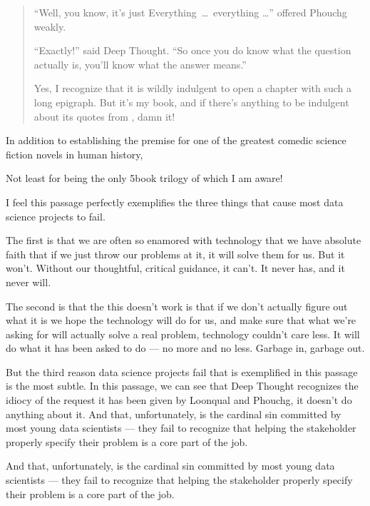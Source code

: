 \documentclass[letterpaper,10pt,english]{jupyterBook}
\begin{document}
\begin{quote}
\sphinxAtStartPar
“Well, you know, it’s just Everything … everything …” offered Phouchg weakly.

\sphinxAtStartPar
“Exactly!” said Deep Thought. “So once you do know what the question actually is, you’ll know what the answer means.”%
\begin{footnote}[1]\sphinxAtStartFootnote
Yes, I recognize that it is wildly indulgent to open a chapter with such a long epigraph. But it’s my book, and if there’s anything to be indulgent about its quotes from , damn it!
%
\end{footnote}
\end{quote}

\sphinxAtStartPar
In addition to establishing the premise for one of the greatest comedic science fiction novels in human history,%
\begin{footnote}[2]\sphinxAtStartFootnote
Not least for being the only 5\sphinxhyphen{}book trilogy of which I am aware!
%
\end{footnote} I feel this passage perfectly exemplifies the three things that cause most data science projects to fail.

\sphinxAtStartPar
The first is that we are often so enamored with technology that we have absolute faith that if we just throw our problems at it, it will solve them for us. But it won’t. Without our thoughtful, critical guidance, it can’t. It never has, and it never will.

\sphinxAtStartPar
The second is that the  this doesn’t work is that if we don’t actually figure out what it is we hope the technology will do for us, and make sure that what we’re asking for will actually solve a real problem, technology couldn’t care less. It will do what it has been asked to do — no more and no less. Garbage in, garbage out.

\sphinxAtStartPar
But the third reason data science projects fail that is exemplified in this passage is the most subtle. In this passage, we can see that Deep Thought recognizes the idiocy of the request it has been given by Loonqual and Phouchg, it doesn’t do anything about it. And that, unfortunately, is the cardinal sin committed by most young data scientists — they fail to recognize that helping the stakeholder properly specify their problem is a core part of the job.

\begin{sphinxShadowBox}

\sphinxAtStartPar
And that, unfortunately, is the cardinal sin committed by most young data scientists — they fail to recognize that helping the stakeholder properly specify their problem is a core part of the job.
\end{sphinxShadowBox}
\end{document}
